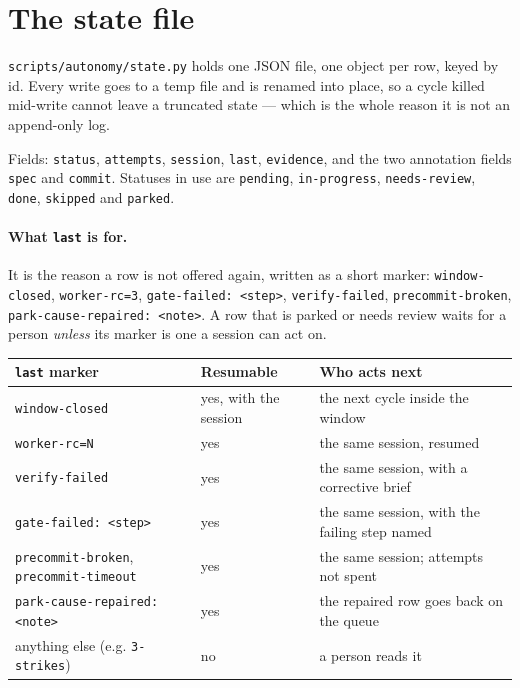 \section{The state file}

\texttt{scripts/autonomy/state.py} holds one JSON file, one object per row, keyed by id. Every
write goes to a temp file and is renamed into place, so a cycle killed mid-write cannot leave
a truncated state --- which is the whole reason it is not an append-only log.

Fields: \texttt{status}, \texttt{attempts}, \texttt{session}, \texttt{last},
\texttt{evidence}, and the two annotation fields \texttt{spec} and \texttt{commit}. Statuses
in use are \texttt{pending}, \texttt{in-progress}, \texttt{needs-review}, \texttt{done},
\texttt{skipped} and \texttt{parked}.

\paragraph{What \texttt{last} is for.} It is the reason a row is not offered again, written as
a short marker: \texttt{window-closed}, \texttt{worker-rc=3}, \texttt{gate-failed: <step>},
\texttt{verify-failed}, \texttt{precommit-broken}, \texttt{park-cause-repaired: <note>}. A row
that is parked or needs review waits for a person \emph{unless} its marker is one a session
can act on.

\begin{longtable}{@{}p{}p{}p{}@{}}
\toprule
\textbf{\texttt{last} marker} & \textbf{Resumable} & \textbf{Who acts next} \\
\midrule
\endhead
\texttt{window-closed} & yes, with the session & the next cycle inside the window \\
\texttt{worker-rc=N} & yes & the same session, resumed \\
\texttt{verify-failed} & yes & the same session, with a corrective brief \\
\texttt{gate-failed: <step>} & yes & the same session, with the failing step named \\
\texttt{precommit-broken}, \texttt{precommit-timeout} & yes & the same session; attempts not
spent \\
\texttt{park-cause-repaired: <note>} & yes & the repaired row goes back on the queue \\
anything else (e.g. \texttt{3-strikes}) & no & a person reads it \\
\bottomrule
\end{longtable}

